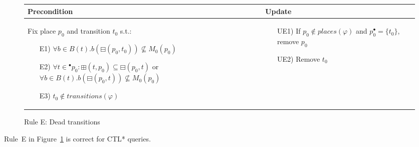 \begin{figure}[h!]
    \vspace{5mm}
    \begin{adjustbox}{center}
        \begin{tabular}{|p{65mm}|p{45mm}|}
            \hline
            Precondition & Update \\ \hline
            Fix place $p_0$ and transition $t_0$ s.t.:
            \begin{itemize}[leftmargin=10mm]
                \item[E1)] $\forall b\in B(t) . b(\boxminus(p_0,t_0))\not\subseteq M_0(p_0)$
                \item[E2)] $\forall t \in {}^\bullet p_0: \boxplus(t, p_0) \subseteq \boxminus(p_0,t)$ or $\forall b\in B(t) . b(\boxminus(p_0,t))\not\subseteq M_0(p_0)$
                \item[E3)] $t_0\notin transitions(\varphi)$
            \end{itemize}
            &
            \begin{itemize}[leftmargin=10mm]
                \item[UE1)] If $p_0 \not \in places(\varphi)$ and $p_0^\bullet = \{t_0\}$, remove $p_0$
                \item[UE2)] Remove $t_0$
            \end{itemize} \\ \hline
        \end{tabular}
    \end{adjustbox}
    \caption{Rule E: Dead transitions}
    \label{fig:rule_e_cpn}
\end{figure}

\begin{theorem}
    Rule~E in Figure~\ref{fig:rule_e_cpn} is correct for CTL* queries.
\end{theorem}